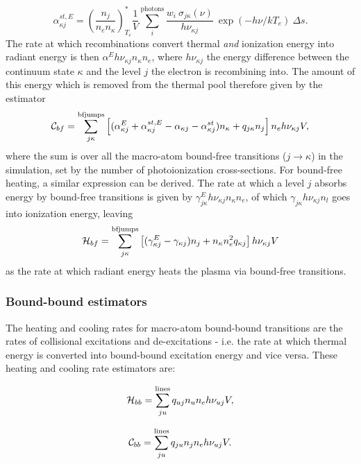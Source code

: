 \begin{equation}
\alpha_{\kappa j}^{st,E} = \left( \frac{n_j}{n_e n_\kappa} \right)^*_{T_e}
\frac{1}{V} \sum_i^{\mathrm{photons}}
\frac{w_i~\sigma_{j\kappa}({\nu})}{h \nu_{\kappa j}}
~\exp(-h\nu/kT_e)~\Delta s.
\end{equation}
The rate at which recombinations convert
thermal {\em and} ionization energy into radiant energy is then
$\alpha^E h\nu_{\kappa j} n_\kappa n_e$, where $h \nu_{\kappa j}$
the energy difference between the continuum state $\kappa$ and 
the level $j$ the electron is recombining into. 
The amount of this energy which is removed from the thermal pool
therefore given by the estimator
\begin{equation}
{\cal C}_{bf} = \sum_{j\kappa}^{\mathrm{bfjumps}} 
\left[ (\alpha^E_{\kappa j} + \alpha^{st,E}_{\kappa j} - \alpha_{\kappa j} - \alpha^{st}_{\kappa j}) 
n_{\kappa} + 
q_{j\kappa} n_j \right]
n_e h\nu_{\kappa j} V,
\end{equation}
where the sum is over all the macro-atom bound-free transitions ($j\rightarrow\kappa$) 
in the simulation, set by
the number of photoionization cross-sections. 
For bound-free heating, a similar expression can be derived. The rate at which
a level $j$ absorbs energy by bound-free 
transitions is given by $\gamma^E_{j\kappa} h\nu_{\kappa j} n_\kappa n_e$,
of which $\gamma_{j\kappa} h \nu_{\kappa j} n_l$ goes into ionization energy, leaving 
\begin{equation}
{\cal H}_{bf} = \sum_{j\kappa}^{\mathrm{bfjumps}} \left[ (\gamma^E_{\kappa j} - \gamma_{\kappa j}) n_j + n_\kappa n_e^2 q_{\kappa j} \right] h \nu_{\kappa j} V
\end{equation}
as the rate at which radiant energy heats the plasma via bound-free transitions.

\subsubsection{Bound-bound estimators}
The heating and cooling rates for macro-atom bound-bound transitions are the rates of
collisional excitations and de-excitations
- i.e. the rate at which thermal energy is converted into
bound-bound excitation energy and vice versa.
These heating and cooling rate estimators are:

\begin{equation}
{\cal H}_{bb} = \sum_{ju}^{\mathrm{lines}} q_{uj} n_u n_e h \nu_{uj} V,
\end{equation}


\begin{equation}
{\cal C}_{bb} = \sum_{ju}^{\mathrm{lines}} q_{ju} n_j n_e h \nu_{uj} V.
\end{equation}

